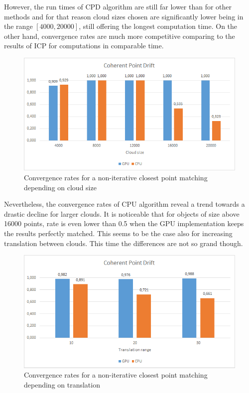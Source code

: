 \documentclass[titlepage]{article}
\begin{document}
However, the run times of CPD algorithm are still far lower than for other methods and for that reason cloud sizes chosen are significantly lower being in the range $[4000, 20000]$, still offering the longest computation time. On the other hand, convergence rates are much more competitive comparing to the results of ICP for computations in comparable time.
\begin{figure}[H]
\includegraphics[width=\textwidth]{ss-cpd-1.png}
\caption{Convergence rates for a non-iterative closest point matching depending on cloud size}
\end{figure}
Nevertheless, the convergence rates of CPU algorithm reveal a trend towards a drastic decline for larger clouds. It is noticeable that for objects of size above 16000 points, rate is even lower than 0.5 when the GPU implementation keeps the results perfectly matched.
This seems to be the case also for increasing translation between clouds. This time the differences are not so grand though.
\begin{figure}[H]
\includegraphics[width=\textwidth]{ss-cpd-2.png}
\caption{Convergence rates for a non-iterative closest point matching depending on translation}
\end{figure}
\end{document}
